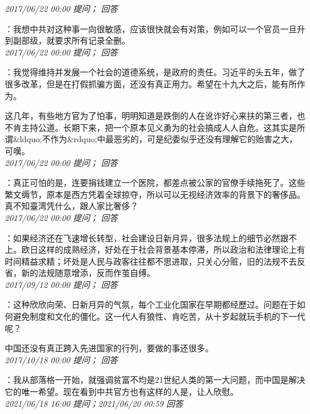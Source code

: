 \documentclass[twocolumn]{ctexart}
\begin{document}
\textit{\hfill\noindent\small 2017/06/22 00:00 提问； 回答}

：我想中共对这种事一向很敏感，应该很快就会有对策，例如可以一个官员一旦升到副部级，就要求所有记录全删。\\

\textit{\hfill\noindent\small 2017/06/22 00:00 提问； 回答}

：我觉得维持并发展一个社会的道德系统，是政府的责任。习近平的头五年，做了很多改革，但是在打假抓骗方面，还没有真正用力。希望在十九大之后，能有所作为。

这几年，有些地方官为了怕事，明明知道是跌倒的人在讹诈好心来扶的第三者，也不肯主持公道。长期下来，把一个原本见义勇为的社会搞成人人自危。这其实是所谓\&ldquo;不作为\&rdquo;中最恶劣的，可是纪委似乎还没有理解它的贻害之大，可嘆。\\

\textit{\hfill\noindent\small 2017/06/22 00:00 提问； 回答}

：真正可怕的是，连要捐钱建立一个医院，都差点被公家的官僚手续拖死了。这些繁文缛节，原本是西方凭着全球掠夺，所以可以无视经济效率的背景下的奢侈品。真不知臺湾凭什么，跟人家比奢侈？\\

\textit{\hfill\noindent\small 2017/06/22 00:00 提问； 回答}

：如果经济还在飞速增长转型，社会建设日新月异，很多法规上的细节必然跟不上。欧日这样的成熟经济，好处在于社会背景基本停滞，所以政治和法律理论上有时间精益求精；坏处是人民与政客往往都不思进取，只关心分赃，旧的法规不去反省，新的法规随意增添，反而作茧自缚。\\

\textit{\hfill\noindent\small 2017/09/12 00:00 提问； 回答}

：这种欣欣向荣、日新月异的气氛，每个工业化国家在早期都经歷过。问题在于如何避免制度和文化的僵化。这一代人有狼性、肯吃苦，从十岁起就玩手机的下一代呢？

中国还没有真正跨入先进国家的行列，要做的事还很多。\\

\textit{\hfill\noindent\small 2017/10/18 00:00 提问； 回答}

：我从部落格一开始，就强调贫富不均是21世纪人类的第一大问题，而中国是解决它的唯一希望。现在看到中共官方也有这样的人是，让人欣慰。\\

\textit{\hfill\noindent\small 2021/06/18 16:00 提问；2021/06/20 00:59 回答}
\end{document}
